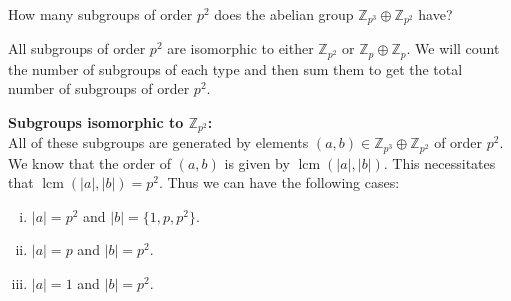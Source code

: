 \documentclass{article}
\def\zz{{\mathbb Z}}
\begin{document}
\begin{problem}[II.2.9] \\ 
    How many subgroups of order $p^2$ does the abelian group $\zz_{p^3} \oplus \zz_{p^2}$ have?
\end{problem}

All subgroups of order $p^2$ are isomorphic to either $\zz_{p^2}$ or $\zz_p \oplus \zz_p$. We will count the number of subgroups of each type and then sum them to get the total number of subgroups of order $p^2$.

\textbf{Subgroups isomorphic to $\zz_{p^2}$:} \\
All of these subgroups are generated by elements $(a,b) \in \zz_{p^3} \oplus \zz_{p^2}$ of order $p^2$. We know that the order of $(a,b)$ is given by $\operatorname{lcm}(|a|, |b|)$. This necessitates that $\operatorname{lcm}(|a|, |b|) = p^2$. Thus we can have the following cases:
\begin{enumerate}[(i)]
    \item $|a| = p^2$ and $|b| = \{ 1, p, p^2 \}$.
    \item $|a| = p$ and $|b| = p^2$.
    \item $|a| = 1$ and $|b| = p^2$.
\end{enumerate}
\end{document}
